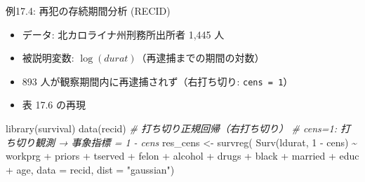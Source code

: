 \documentclass[
  ignorenonframetext,
]{beamer}
\newenvironment{Shaded}{\begin{snugshade}}{\end{snugshade}}
\newcommand{\AttributeTok}[1]{\textcolor[rgb]{0.77,0.63,0.00}{#1}}
\newcommand{\CommentTok}[1]{\textcolor[rgb]{0.56,0.35,0.01}{\textit{#1}}}
\newcommand{\DecValTok}[1]{\textcolor[rgb]{0.00,0.00,0.81}{#1}}
\newcommand{\FunctionTok}[1]{\textcolor[rgb]{0.00,0.00,0.00}{#1}}
\newcommand{\NormalTok}[1]{#1}
\newcommand{\OtherTok}[1]{\textcolor[rgb]{0.56,0.35,0.01}{#1}}
\newcommand{\SpecialCharTok}[1]{\textcolor[rgb]{0.00,0.00,0.00}{#1}}
\newcommand{\StringTok}[1]{\textcolor[rgb]{0.31,0.60,0.02}{#1}}
\providecommand{\tightlist}{%
  \setlength{\itemsep}{0pt}\setlength{\parskip}{0pt}}
\begin{document}
\begin{frame}[fragile]{例17.4: 再犯の存続期間分析 (RECID)}
\protect\hypertarget{ux4f8b17.4-ux518dux72afux306eux5b58ux7d9aux671fux9593ux5206ux6790-recid}{}
\begin{itemize}
\tightlist
\item
  データ: 北カロライナ州刑務所出所者 1,445 人
\item
  被説明変数: \(\log(durat)\)（再逮捕までの期間の対数）
\item
  893 人が観察期間内に再逮捕されず（右打ち切り: \texttt{cens\ =\ 1}）
\item
  表 17.6 の再現
\end{itemize}

\footnotesize

\begin{Shaded}
\begin{Highlighting}[]
\FunctionTok{library}\NormalTok{(survival)}
\FunctionTok{data}\NormalTok{(recid)}
\CommentTok{\# 打ち切り正規回帰（右打ち切り）}
\CommentTok{\# cens=1: 打ち切り観測 → 事象指標 = 1 {-} cens}
\NormalTok{res\_cens }\OtherTok{\textless{}{-}} \FunctionTok{survreg}\NormalTok{(}
  \FunctionTok{Surv}\NormalTok{(ldurat, }\DecValTok{1} \SpecialCharTok{{-}}\NormalTok{ cens) }\SpecialCharTok{\textasciitilde{}}\NormalTok{ workprg }\SpecialCharTok{+}\NormalTok{ priors }\SpecialCharTok{+}\NormalTok{ tserved }\SpecialCharTok{+}
\NormalTok{    felon }\SpecialCharTok{+}\NormalTok{ alcohol }\SpecialCharTok{+}\NormalTok{ drugs }\SpecialCharTok{+}\NormalTok{ black }\SpecialCharTok{+}\NormalTok{ married }\SpecialCharTok{+}\NormalTok{ educ }\SpecialCharTok{+}\NormalTok{ age,}
  \AttributeTok{data =}\NormalTok{ recid, }\AttributeTok{dist =} \StringTok{"gaussian"}\NormalTok{)}
\end{Highlighting}
\end{Shaded}

\normalsize
\end{frame}
\end{document}
